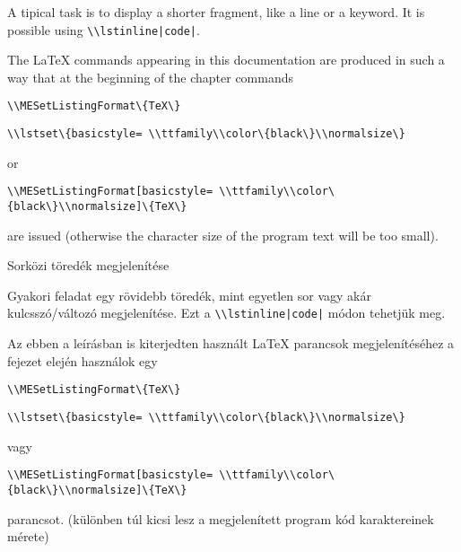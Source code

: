 {
A tipical task is to display a shorter fragment, like a line or a keyword.
It is possible using \lstinline!\\lstinline|code|!.

The LaTeX commands appearing in this documentation are produced in such a way that
at the beginning of the chapter commands


\noindent\lstinline|\\MESetListingFormat\{TeX\}|\par
\noindent\lstinline|\\lstset\{basicstyle= \\ttfamily\\color\{black\}\\normalsize\}|

\noindent or

\noindent\lstinline|\\MESetListingFormat[basicstyle= \\ttfamily\\color\{black\}\\normalsize]\{TeX\}|

\noindent are issued (otherwise the character size of the program text will be too small).
}
{Sorközi töredék megjelenítése}
{
Gyakori feladat egy rövidebb töredék, mint egyetlen sor vagy akár kulcsszó/változó
megjelenítése. Ezt a  \lstinline!\\lstinline|code|! módon tehetjük meg.

Az ebben a leírásban is kiterjedten használt LaTeX parancsok megjelenítéséhez
a fejezet elején használok egy 


\noindent\lstinline|\\MESetListingFormat\{TeX\}|\par
\noindent\lstinline|\\lstset\{basicstyle= \\ttfamily\\color\{black\}\\normalsize\}|

\noindent vagy

\noindent\lstinline|\\MESetListingFormat[basicstyle= \\ttfamily\\color\{black\}\\normalsize]\{TeX\}|

\noindent parancsot. (különben túl kicsi lesz a megjelenített program kód karaktereinek mérete)
}

